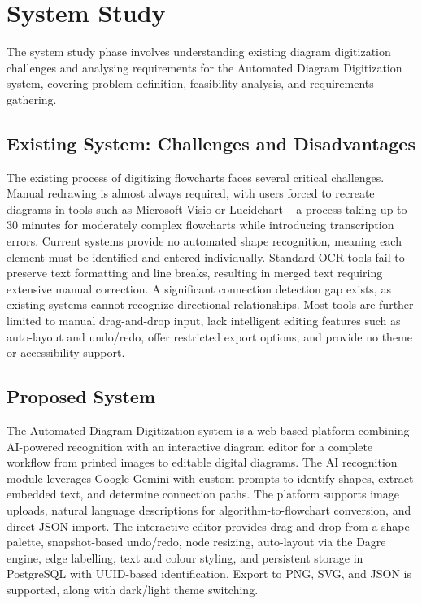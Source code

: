 
\chapter{System Study}
\label{ch:systemstudy}

The system study phase involves understanding existing diagram digitization challenges and analysing requirements for the Automated Diagram Digitization system, covering problem definition, feasibility analysis, and requirements gathering.

\section{Existing System: Challenges and Disadvantages}
\label{sec:existing-system}
 
The existing process of digitizing flowcharts faces several critical challenges. Manual redrawing is almost always required, with users forced to recreate diagrams in tools such as Microsoft Visio or Lucidchart -- a process taking up to 30 minutes for moderately complex flowcharts while introducing transcription errors. Current systems provide no automated shape recognition, meaning each element must be identified and entered individually. Standard OCR tools fail to preserve text formatting and line breaks, resulting in merged text requiring extensive manual correction. A significant connection detection gap exists, as existing systems cannot recognize directional relationships. Most tools are further limited to manual drag-and-drop input, lack intelligent editing features such as auto-layout and undo/redo, offer restricted export options, and provide no theme or accessibility support.

\section{Proposed System}
\label{sec:proposed-system}
 
The Automated Diagram Digitization system is a web-based platform combining AI-powered recognition with an interactive diagram editor for a complete workflow from printed images to editable digital diagrams. The AI recognition module leverages Google Gemini with custom prompts to identify shapes, extract embedded text, and determine connection paths. The platform supports image uploads, natural language descriptions for algorithm-to-flowchart conversion, and direct JSON import. The interactive editor provides drag-and-drop from a shape palette, snapshot-based undo/redo, node resizing, auto-layout via the Dagre engine, edge labelling, text and colour styling, and persistent storage in PostgreSQL with UUID-based identification. Export to PNG, SVG, and JSON is supported, along with dark/light theme switching.
 

